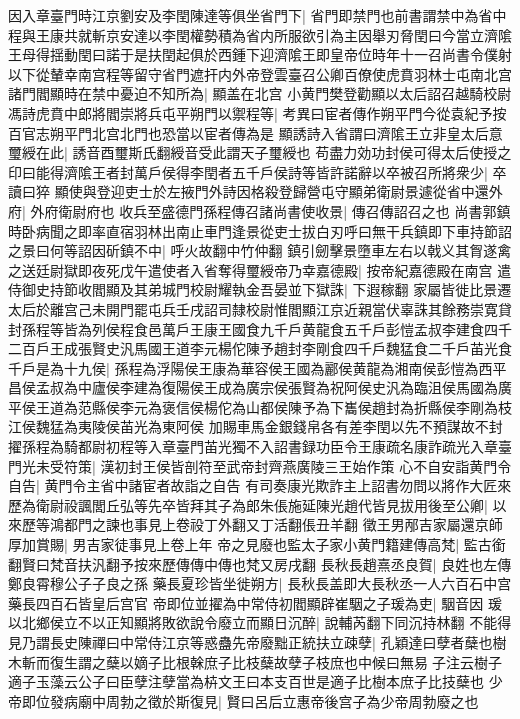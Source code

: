 因入章臺門時江京劉安及李閏陳達等俱坐省門下|{
	省門即禁門也前書謂禁中為省中}
程與王康共就斬京安達以李閏權勢積為省内所服欲引為主因舉刃脅閏曰今當立濟隂王母得揺動閏曰諾于是扶閏起俱於西鍾下迎濟隂王即皇帝位時年十一召尚書令僕射以下從輦幸南宫程等留守省門遮扞内外帝登雲臺召公卿百僚使虎賁羽林士屯南北宫諸門閻顯時在禁中憂迫不知所為|{
	顯盖在北宫}
小黄門樊登勸顯以太后詔召越騎校尉馮詩虎賁中郎將閻崇將兵屯平朔門以禦程等|{
	考異曰宦者傳作朔平門今從袁紀予按百官志朔平門北宫北門也恐當以宦者傳為是}
顯誘詩入省謂曰濟隂王立非皇太后意璽綬在此|{
	誘音酉璽斯氏翻綬音受此謂天子璽綬也}
苟盡力効功封侯可得太后使授之印曰能得濟隂王者封萬戶侯得李閏者五千戶侯詩等皆許諾辭以卒被召所將衆少|{
	卒讀曰猝}
顯使與登迎吏士於左掖門外詩因格殺登歸營屯守顯弟衛尉景遽從省中還外府|{
	外府衛尉府也}
收兵至盛德門孫程傳召諸尚書使收景|{
	傳召傳詔召之也}
尚書郭鎮時卧病聞之即率直宿羽林出南止車門逢景從吏士拔白刃呼曰無干兵鎮即下車持節詔之景曰何等詔因斫鎮不中|{
	呼火故翻中竹仲翻}
鎮引劒擊景墮車左右以戟义其胷遂禽之送廷尉獄即夜死戊午遣使者入省奪得璽綬帝乃幸嘉德殿|{
	按帝紀嘉德殿在南宫}
遣侍御史持節收閻顯及其弟城門校尉耀執金吾晏並下獄誅|{
	下遐稼翻}
家屬皆徙比景遷太后於離宫己未開門罷屯兵壬戌詔司隸校尉惟閻顯江京近親當伏辜誅其餘務崇寛貸封孫程等皆為列侯程食邑萬戶王康王國食九千戶黄龍食五千戶彭愷孟叔李建食四千二百戶王成張賢史汎馬國王道李元楊佗陳予趙封李剛食四千戶魏猛食二千戶苖光食千戶是為十九侯|{
	孫程為浮陽侯王康為華容侯王國為酈侯黄龍為湘南侯彭愷為西平昌侯孟叔為中廬侯李建為復陽侯王成為廣宗侯張賢為祝阿侯史汎為臨沮侯馬國為廣平侯王道為范縣侯李元為褒信侯楊佗為山都侯陳予為下巂侯趙封為折縣侯李剛為枝江侯魏猛為夷陵侯苖光為東阿侯}
加賜車馬金銀錢帛各有差李閏以先不預謀故不封擢孫程為騎都尉初程等入章臺門苖光獨不入詔書録功臣令王康疏名康詐疏光入章臺門光未受符策|{
	漢初封王侯皆剖符至武帝封齊燕廣陵三王始作策}
心不自安詣黄門令自告|{
	黄門令主省中諸宦者故詣之自告}
有司奏康光欺詐主上詔書勿問以將作大匠來歷為衛尉祋諷閭丘弘等先卒皆拜其子為郎朱倀施延陳光趙代皆見拔用後至公卿|{
	以來歷等鴻都門之諫也事見上卷祋丁外翻又丁活翻倀丑羊翻}
徵王男邴吉家屬還京師厚加賞賜|{
	男吉家徒事見上卷上年}
帝之見廢也監太子家小黄門籍建傳高梵|{
	監古銜翻賢曰梵音扶汎翻予按來歷傳傳中傳也梵又房戌翻}
長秋長趙熹丞良賀|{
	良姓也左傳鄭良霄穆公子子良之孫}
藥長夏珍皆坐徙朔方|{
	長秋長盖即大長秋丞一人六百石中宫藥長四百石皆皇后宫官}
帝即位並擢為中常侍初閻顯辟崔駰之子瑗為吏|{
	駰音因}
瑗以北鄉侯立不以正知顯將敗欲說令廢立而顯日沉醉|{
	說輔芮翻下同沉持林翻}
不能得見乃謂長史陳禪曰中常侍江京等惑蠱先帝廢黜正統扶立疎孽|{
	孔穎達曰孽者蘖也樹木斬而復生謂之蘖以嫡子比根榦庶子比枝蘖故孽子枝庶也中候曰無易子注云樹子適子玉藻云公子曰臣孽注孽當為枿文王曰本支百世是適子比樹本庶子比技蘖也}
少帝即位發病廟中周勃之徵於斯復見|{
	賢曰呂后立惠帝後宫子為少帝周勃廢之也}
